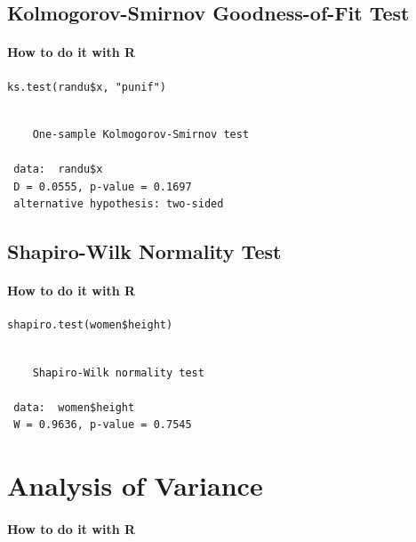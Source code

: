 \documentclass[captions=tableheading]{scrbook}
\begin{document}
\label{sec:Other-Hypothesis-Tests}
\subsection{Kolmogorov-Smirnov Goodness-of-Fit Test\label{sub:Kolmogorov-Smirnov-Goodness-of-Fit-Test}}
\label{sec-10-4-1}


\paragraph*{How to do it with \textsf{R}}


\begin{verbatim}
ks.test(randu$x, "punif")
\end{verbatim}

\begin{verbatim}
 
 	One-sample Kolmogorov-Smirnov test
 
 data:  randu$x 
 D = 0.0555, p-value = 0.1697
 alternative hypothesis: two-sided
\end{verbatim}
\subsection{Shapiro-Wilk Normality Test}
\label{sec-10-4-2}

\label{sub:Shapiro-Wilk-Normality-Test}

\paragraph*{How to do it with \textsf{R}}


\begin{verbatim}
shapiro.test(women$height)
\end{verbatim}

\begin{verbatim}
 
 	Shapiro-Wilk normality test
 
 data:  women$height 
 W = 0.9636, p-value = 0.7545
\end{verbatim}
\section{Analysis of Variance}
\label{sec-10-5}

\label{sec:Analysis-of-Variance}

\paragraph*{How to do it with \textsf{R}}
\end{document}
